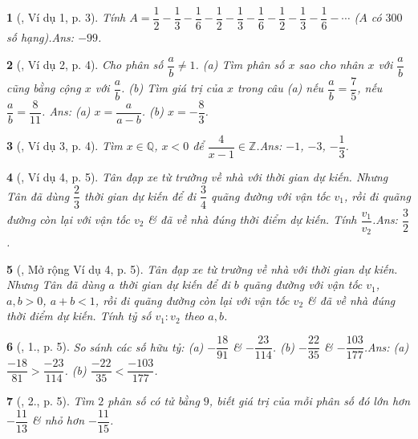 \documentclass{article}
\newtheorem{baitoan}{}
\begin{document}
\begin{baitoan}[\cite{Binh_Toan_7_tap_1}, Ví dụ 1, p. 3]
	Tính $A = \dfrac{1}{2} - \dfrac{1}{3} - \dfrac{1}{6} - \dfrac{1}{2} - \dfrac{1}{3} - \dfrac{1}{6} - \dfrac{1}{2} - \dfrac{1}{3} - \dfrac{1}{6} - \cdots$ ($A$ có $300$ số hạng).\hfill{\sf Ans: $-99$.}
\end{baitoan}

\begin{baitoan}[\cite{Binh_Toan_7_tap_1}, Ví dụ 2, p. 4]
	Cho phân số $\dfrac{a}{b}\ne 1$.	(a) Tìm phân số $x$ sao cho nhân $x$ với $\dfrac{a}{b}$ cũng bằng cộng $x$ với $\dfrac{a}{b}$. (b) Tìm giá trị của $x$ trong câu (a) nếu $\dfrac{a}{b} = \dfrac{7}{5}$, nếu $\dfrac{a}{b} = \dfrac{8}{11}$. \hfill{\sf Ans: (a) $x = \dfrac{a}{a - b}$. (b) $x = -\dfrac{8}{3}$.}
\end{baitoan}

\begin{baitoan}[\cite{Binh_Toan_7_tap_1}, Ví dụ 3, p. 4]
	Tìm $x\in\mathbb{Q}$, $x < 0$ để $\dfrac{4}{x - 1}\in\mathbb{Z}$.\hfill{\sf Ans: $-1$, $-3$, $-\dfrac{1}{3}$.}
\end{baitoan}

\begin{baitoan}[\cite{Binh_Toan_7_tap_1}, Ví dụ 4, p. 5]
	Tân đạp xe từ trường về nhà với thời gian dự kiến. Nhưng Tân đã dùng $\dfrac{2}{3}$ thời gian dự kiến để đi $\dfrac{3}{4}$ quãng đường với vận tốc $v_1$, rồi đi quãng đường còn lại với vận tốc $v_2$ \& đã về nhà đúng thời điểm dự kiến. Tính $\dfrac{v_1}{v_2}$.\hfill{\sf Ans: $\dfrac{3}{2}$.}
\end{baitoan}

\begin{baitoan}[\cite{Binh_Toan_7_tap_1}, Mở rộng Ví dụ 4, p. 5]
	Tân đạp xe từ trường về nhà với thời gian dự kiến. Nhưng Tân đã dùng $a$ thời gian dự kiến để đi $b$ quãng đường với vận tốc $v_1$, $a,b > 0$, $a + b < 1$, rồi đi quãng đường còn lại với vận tốc $v_2$ \& đã về nhà đúng thời điểm dự kiến. Tính tỷ số $v_1:v_2$ theo $a,b$.
\end{baitoan}

\begin{baitoan}[\cite{Binh_Toan_7_tap_1}, 1., p. 5]
	So sánh các số hữu tỷ: (a) $-\dfrac{18}{91}$ \& $-\dfrac{23}{114}$. (b) $-\dfrac{22}{35}$ \& $-\dfrac{103}{177}$.\hfill{\sf Ans: (a) $\dfrac{-18}{81} > \dfrac{-23}{114}$. (b) $\dfrac{-22}{35} < \dfrac{-103}{177}$.}
\end{baitoan}

\begin{baitoan}[\cite{Binh_Toan_7_tap_1}, 2., p. 5]
	Tìm $2$ phân số có tử bằng $9$, biết giá trị của mỗi phân số đó lớn hơn $-\dfrac{11}{13}$ \& nhỏ hơn $-\dfrac{11}{15}$.
\end{baitoan}
\end{document}
